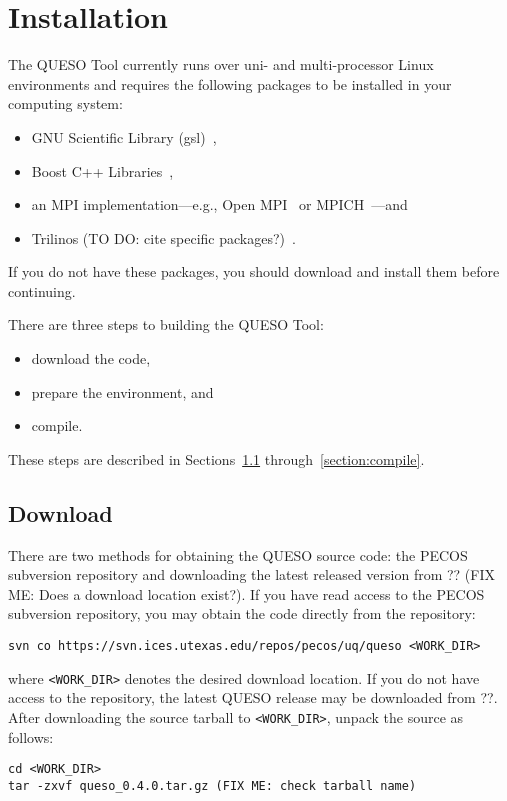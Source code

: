 \chapter{Installation}\label{ch-install}
\thispagestyle{headings}

The QUESO Tool currently runs over uni- and multi-processor Linux
environments and requires the following packages to be installed in
your computing system:
%
\begin{itemize}
\item GNU Scientific Library (gsl)~\cite{gsl},
\item Boost C++ Libraries~\cite{boost}, 
\item an MPI implementation---e.g., Open MPI~\cite{Openmpi} or MPICH~\cite{Mpich}---and
\item Trilinos (TO DO: cite specific packages?)~\cite{Trilinos}.
\end{itemize}
%
If you do not have these packages, you should download and install
them before continuing.

There are three steps to building the QUESO Tool:
%
\begin{itemize}
\item download the code,
\item prepare the environment, and
\item compile.
\end{itemize}
%
These steps are described in Sections~\ref{section:download}
through~\ref{section:compile}.

\section{Download} \label{section:download}
There are two methods for obtaining the QUESO source code: the PECOS
subversion repository and downloading the latest released version from
?? (FIX ME: Does a download location exist?).  If you have read access
to the PECOS subversion repository, you may obtain the code directly
from the repository:
%
\begin{verbatim}
svn co https://svn.ices.utexas.edu/repos/pecos/uq/queso <WORK_DIR>
\end{verbatim}
%
where \verb+<WORK_DIR>+ denotes the desired download location.  If you
do not have access to the repository, the latest QUESO release may be
downloaded from ??.  After
downloading the source tarball to \verb+<WORK_DIR>+, unpack the source
as follows:
%
\begin{verbatim}
cd <WORK_DIR>
tar -zxvf queso_0.4.0.tar.gz (FIX ME: check tarball name)
\end{verbatim}
%

